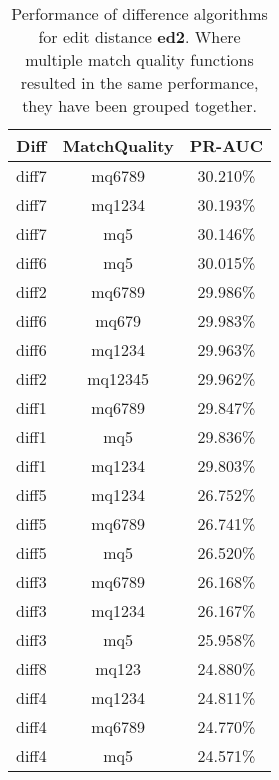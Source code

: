 \begin{table}[tbph]
\begin{center}
\begin{tabular}{|c|c||c|}
\hline
Diff & MatchQuality & PR-AUC  \\
\hline
\hline
diff7 & mq6789 & 30.210\% \\
diff7 & mq1234 & 30.193\% \\
diff7 & mq5 & 30.146\% \\
diff6 & mq5 & 30.015\% \\
diff2 & mq6789 & 29.986\% \\
diff6 & mq679 & 29.983\% \\
diff6 & mq1234 & 29.963\% \\
diff2 & mq12345 & 29.962\% \\
diff1 & mq6789 & 29.847\% \\
diff1 & mq5 & 29.836\% \\
diff1 & mq1234 & 29.803\% \\
diff5 & mq1234 & 26.752\% \\
diff5 & mq6789 & 26.741\% \\
diff5 & mq5 & 26.520\% \\
diff3 & mq6789 & 26.168\% \\
diff3 & mq1234 & 26.167\% \\
diff3 & mq5 & 25.958\% \\
diff8 & mq123 & 24.880\% \\
diff4 & mq1234 & 24.811\% \\
diff4 & mq6789 & 24.770\% \\
diff4 & mq5 & 24.571\% \\
\hline
\end{tabular}
\end{center}
\caption{Performance of difference algorithms for
  edit distance \textbf{ed2}.  Where multiple match
  quality functions resulted in the same performance, they
  have been grouped together.}
\label{tab:editlongbyed2}
\end{table}
